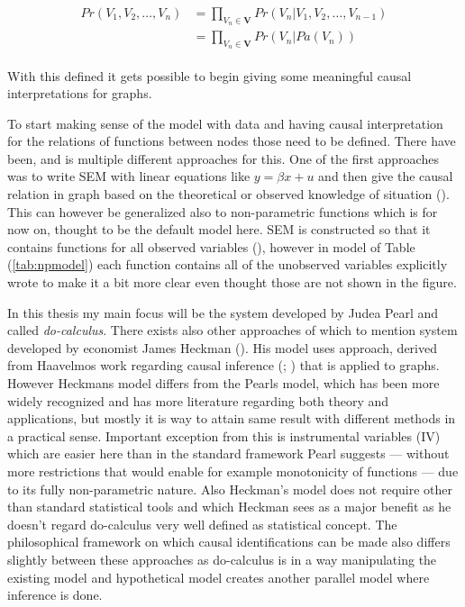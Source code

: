 \documentclass[main=english,12pt,a4paper,pdftex,econ,utf8]{aaltothesis}
\newcommand{\pa}[1]{Pa(#1)}
\newcommand{\vars}{\bm{V}}
\begin{document}
\begin{align} \label{eq:factor}
    \begin{split}
        Pr(V_1,V_2,\ldots,V_{n})&=\prod_{V_{n}\in\vars}Pr(V_{n}|V_1,V_2,\ldots,V_{n-1}) \\
        &=\prod_{V_{n}\in\vars}Pr(V_{n}|\pa{V_{n}})
    \end{split}
\end{align}

\noindent With this defined it gets possible to begin giving some meaningful causal interpretations for graphs.

To start making sense of the model with data and having causal interpretation for the relations of functions between nodes those need to be defined. There have been, and is multiple different approaches for this. One of the first approaches was to write SEM with linear equations like $y=\beta x+u$ and then give the causal relation in graph based on the theoretical or observed knowledge of situation (\cite{Wright1921}). This can however be generalized also to non-parametric functions which is for now on, thought to be the default model here. SEM is constructed so that it contains functions for all observed variables (\cite{Pearl2008}), however in model of Table (\ref{tab:npmodel}) each function contains all of the unobserved variables explicitly wrote to make it a bit more clear even thought those are not shown in the figure.



In this thesis my main focus will be the system developed by Judea Pearl and called \textit{do-calculus}. There exists also other approaches of which to mention system developed by economist James Heckman (\cite{Heckman2015}). His model uses approach, derived from Haavelmos work regarding causal inference (\cite{Haavelmo1943}; \cite{Haavelmo1944}) that is applied to graphs. However Heckmans model differs from the Pearls model, which has been more widely recognized and has more literature regarding both theory and applications, but mostly it is way to attain same result with different methods in a practical sense. Important exception from this is instrumental variables (IV) which are easier here than in the standard framework Pearl suggests --- without more restrictions that would enable for example monotonicity of functions --- due to its fully non-parametric nature. Also Heckman's model does not require other than standard statistical tools and which Heckman sees as a major benefit as he doesn't regard do-calculus very well defined as statistical concept. The philosophical framework on which causal identifications can be made also differs slightly between these approaches as do-calculus is in a way manipulating the existing model and hypothetical model creates another parallel model where inference is done.
\end{document}
